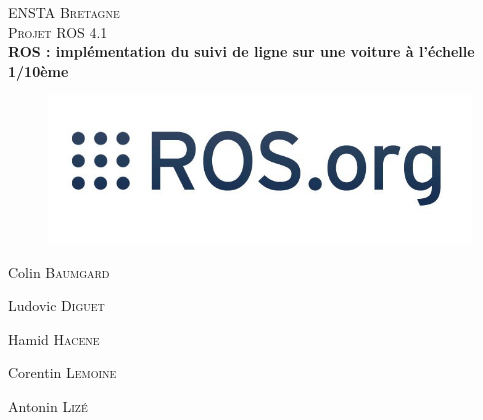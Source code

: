 \documentclass[12pt, openany]{report}
\begin{document}
\author{Colin Baumgard}
\author{Ludovic Diguet}
\author{Hamid Hacene}
\author{Corentin Lemoine}
\author{Antonin Lizé}

\begin{titlepage}
  \begin{sffamily}
    \begin{center}

      \textsc{\LARGE ENSTA Bretagne}\\[2cm]

      \textsc{\Large Projet ROS 4.1}\\[1.5cm]

      { \huge \bfseries ROS : implémentation du suivi de ligne sur une voiture à l'échelle 1/10ème\\[0.4cm] }
      \vfill

      \begin{figure}[H]
        \hfill \includegraphics[scale=0.6]{logoROS.jpg} \hspace*{\fill}
      \end{figure}

      \vfill


      \begin{minipage}{0.30\textwidth}
        Colin \textsc{Baumgard}
      \end{minipage}
      \begin{minipage}{0.30\textwidth}
        Ludovic \textsc{Diguet}
      \end{minipage}
      \begin{minipage}{0.30\textwidth}
        Hamid \textsc{Hacene}
      \end{minipage}
      \begin{minipage}{0.30\textwidth}
        Corentin \textsc{Lemoine}
      \end{minipage}
      \begin{minipage}{0.30\textwidth}
        Antonin \textsc{Lizé}
      \end{minipage}

    \end{center}
  \end{sffamily}
\end{titlepage}
\end{document}
